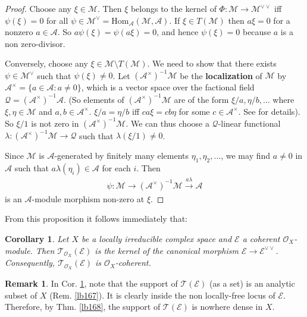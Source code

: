 \documentclass[12pt,b5paper,notitlepage]{report}
\theoremstyle{definition}
\newtheorem{rem}[df]{Remark}
\theoremstyle{plain}
\newtheorem{co}[df]{Corollary}
\newcommand{\mc}{\mathcal}
\newcommand{\Hom}{\mathrm{Hom}}
\newcommand{\scr}{\mathscr}
\numberwithin{equation}{section}
\begin{document}
\begin{proof}
Choose any $\xi\in\mc M$. Then $\xi$ belongs to the kernel of $\Phi:\mc M\rightarrow\mc M^{\vee\vee}$ iff $\psi(\xi)=0$ for all $\psi\in\mc M^\vee=\Hom_{\mc A}(\mc M,\mc A)$. If $\xi\in T(\mc M)$ then $a\xi=0$ for a nonzero $a\in\mc A$. So $a\psi(\xi)=\psi(a\xi)=0$, and hence $\psi(\xi)=0$ because $a$ is a non zero-divisor.

Conversely, choose any $\xi\in\mc M\setminus T(\mc M)$. We need to show that there exists $\psi\in\mc M^\vee$ such that $\psi(\xi)\neq 0$. Let $(\mc A^\times)^{-1}\mc M$ be the \textbf{localization}  of $\mc M$ by $\mc A^\times=\{a\in\mc A:a\neq 0\}$, which is a vector space over the factional field $\mc Q=(\mc A^\times)^{-1}\mc A$. (So elements of $(\mc A^\times)^{-1}\mc M$ are of the form $\xi/a,\eta/b,\dots$ where $\xi,\eta\in\mc M$ and $a,b\in\mc A^\times$. $\xi/a=\eta/b$ iff $ca\xi=cb\eta$ for some $c\in\mc A^\times$. See \cite[Chapter 3]{AM} for details). So $\xi/1$ is not zero in $(\mc A^\times)^{-1}\mc M$. We can thus choose a $\mc Q$-linear functional $\lambda:(\mc A^\times)^{-1}\mc M\rightarrow\mc Q$ such that $\lambda(\xi/1)\neq 0$.

Since $\mc M$ is $\mc A$-generated by finitely many elements $\eta_1,\eta_2,\dots$, we may find $a\neq 0$ in $\mc A$ such that $a\lambda(\eta_i)\in\mc A$ for each $i$. Then
\begin{align*}
\psi:\mc M\rightarrow(\mc A^\times)^{-1}\mc M\xrightarrow{a\lambda}\mc A
\end{align*}
is an $\mc A$-module morphism non-zero at $\xi$.
\end{proof}



From this proposition it follows immediately that:

\begin{co}\label{lb166}
Let $X$ be a locally irreducible complex space and $\scr E$ a coherent $\scr O_X$-module. Then $\scr T_{\scr O_X}(\scr E)$ is the kernel of the canonical morphism $\scr E\rightarrow\scr E^{\vee\vee}$. Consequently, $\scr T_{\scr O_X}(\scr E)$ is $\scr O_X$-coherent.
\end{co}

\begin{rem}
In Cor. \ref{lb166}, note that the support of $\scr T(\scr E)$ (as a set) is an analytic subset of $X$ (Rem. \ref{lb167}). It is clearly inside the non locally-free locus of $\scr E$. Therefore, by Thm. \ref{lb168}, the support of $\scr T(\scr E)$ is nowhere dense in $X$.
\end{rem}
\end{document}
